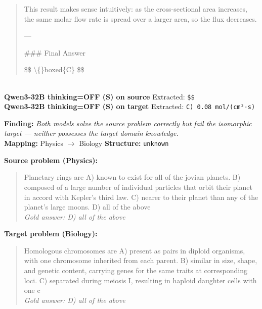 \begin{tcolorbox}[
  colback=gray!5, colframe=gray!40,
  title={\textbf{Example 4: Knowledge-Dependent Gain}},
  fonttitle=\small\bfseries, breakable]
\begin{quote}
This result makes sense intuitively: as the cross-sectional area increases, the same molar flow rate is spread over a larger area, so the flux decreases.

---

\#\#\# Final Answer

\$\$
\textbackslash\{\}boxed\{C\}
\$\$\end{quote}
\\[-2pt]
\textbf{Qwen3-32B thinking=OFF (S) on source} \textcolor{red}{\xmark} Extracted: \texttt{\$\$}
\\[-2pt]
\textbf{Qwen3-32B thinking=OFF (S) on target} \textcolor{darkgreen}{\cmark} Extracted: \texttt{C) 0.08 mol/(cm²·s)}
\\[-2pt]
\end{tcolorbox}
\vspace{8pt}
\begin{tcolorbox}[
  colback=gray!5, colframe=gray!40,
  title={\textbf{Example 5: Pure Knowledge Bottleneck}},
  fonttitle=\small\bfseries, breakable]

\textbf{Finding:} \textit{Both models solve the source problem correctly but fail the isomorphic target — neither possesses the target domain knowledge.}
\\[4pt]
\textbf{Mapping:} Physics $\to$ Biology \quad
\textbf{Structure:} \texttt{unknown}

\vspace{6pt}
\textbf{Source problem (Physics):}\\
\begin{quote}\small Planetary rings are
A) known to exist for all of the jovian planets.
B) composed of a large number of individual particles that orbit their planet in accord with Kepler's third law.
C) nearer to their planet than any of the planet's large moons.
D) all of the above\\
\textit{Gold answer: D) all of the above}\end{quote}

\textbf{Target problem (Biology):}\\
\begin{quote}\small Homologous chromosomes are
A) present as pairs in diploid organisms, with one chromosome inherited from each parent.
B) similar in size, shape, and genetic content, carrying genes for the same traits at corresponding loci.
C) separated during meiosis I, resulting in haploid daughter cells with one c\\
\textit{Gold answer: D) all of the above}\end{quote}


\end{tcolorbox}
